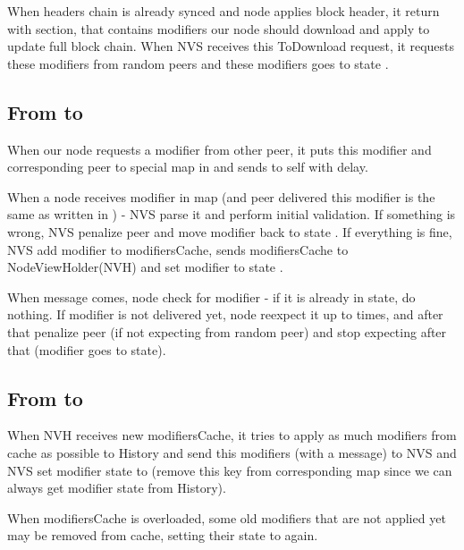 When headers chain is already synced and node applies block header, it return  with  section,
that contains modifiers our node should download and apply to update full block chain.
When NVS receives this ToDownload request, it requests these modifiers from random peers
and these modifiers goes to state .

\subsection{From  to }

When our node requests a modifier from other peer, it puts this modifier and
corresponding peer to special map  in  and sends  to self
with  delay.

When a node receives modifier in  map
(and peer delivered this modifier is the same as written in ) -
NVS parse it and perform initial validation.
If something is wrong, NVS penalize peer and move modifier back to state .
If everything is fine, NVS add modifier to modifiersCache, sends modifiersCache to
NodeViewHolder(NVH) and set modifier to state .

When  message comes, node check for modifier - if it is already in  state,
do nothing.
If modifier is not delivered yet, node reexpect it up to  times, and after that
penalize peer (if not expecting from random peer) and stop expecting after that (modifier goes to  state).

\subsection{From  to }

When NVH receives new modifiersCache, it tries to apply as much modifiers from cache as possible to History
and send this modifiers (with a  message) to NVS and NVS set modifier
state to  (remove this key from corresponding map since we can always get modifier state from History).

When modifiersCache is overloaded, some old modifiers that are not applied yet may be removed from cache, setting
their state to  again.